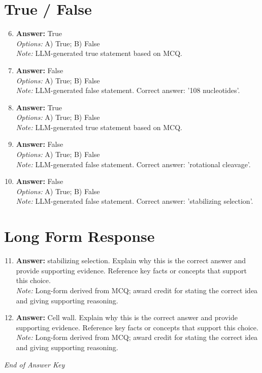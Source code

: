 \documentclass[12pt]{article}
\begin{document}
\section*{True / False}
\begin{enumerate}[label=\arabic*.]
\setcounter{enumi}{5}
\item \textbf{Answer:} True
\\ \textit{Options:} A) True; B) False
\\ \textit{Note:} LLM-generated true statement based on MCQ.
\item \textbf{Answer:} False
\\ \textit{Options:} A) True; B) False
\\ \textit{Note:} LLM-generated false statement. Correct answer: '108 nucleotides'.
\item \textbf{Answer:} True
\\ \textit{Options:} A) True; B) False
\\ \textit{Note:} LLM-generated true statement based on MCQ.
\item \textbf{Answer:} False
\\ \textit{Options:} A) True; B) False
\\ \textit{Note:} LLM-generated false statement. Correct answer: 'rotational cleavage'.
\item \textbf{Answer:} False
\\ \textit{Options:} A) True; B) False
\\ \textit{Note:} LLM-generated false statement. Correct answer: 'stabilizing selection'.
\end{enumerate}

\section*{Long Form Response}
\begin{enumerate}[label=\arabic*.]
\setcounter{enumi}{10}
\item \textbf{Answer:} stabilizing selection. Explain why this is the correct answer and provide supporting
evidence. Reference key facts or concepts that support this choice.
\\ \textit{Note:} Long-form derived from MCQ; award credit for stating the correct idea and giving supporting reasoning.
\item \textbf{Answer:} Cell wall. Explain why this is the correct answer and provide supporting evidence.
Reference key facts or concepts that support this choice.
\\ \textit{Note:} Long-form derived from MCQ; award credit for stating the correct idea and giving supporting reasoning.
\end{enumerate}

\vfill
\noindent\textit{End of Answer Key}
\end{document}
